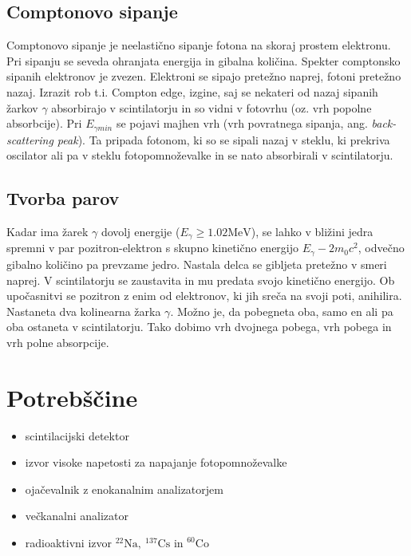 \documentclass[11pt]{article}
\begin{document}
\subsection{Comptonovo sipanje}\label{sec:org322b661}

Comptonovo sipanje je neelastično sipanje fotona na skoraj prostem elektronu.
Pri sipanju se seveda ohranjata energija in gibalna količina. Spekter
comptonsko sipanih elektronov je zvezen. Elektroni se sipajo pretežno naprej,
fotoni pretežno nazaj. Izrazit rob t.i. Compton edge, izgine, saj se
nekateri od nazaj sipanih žarkov \(\gamma\) absorbirajo v scintilatorju in
so vidni v fotovrhu (oz. vrh popolne absorbcije).
Pri \(E_{\gamma min}\) se pojavi majhen vrh (vrh povratnega sipanja, ang.
\emph{back-scattering peak}). Ta pripada fotonom, ki so se sipali nazaj v steklu,
ki prekriva oscilator ali pa v steklu fotopomnoževalke in se nato absorbirali
v scintilatorju.
\subsection{Tvorba parov}\label{sec:org4af1b3a}

Kadar ima žarek \(\gamma\) dovolj energije (\(E_{\gamma} \ge 1.02 \mathrm{MeV}\)),
se lahko v bližini jedra spremni v par pozitron-elektron s skupno kinetično
energijo \(E_{\gamma} - 2 m_0 c ^2\), odvečno gibalno količino pa prevzame
jedro. Nastala delca se gibljeta pretežno v smeri naprej. V scintilatorju se
zaustavita in mu predata svojo kinetično energijo. Ob upočasnitvi se pozitron
z enim od elektronov, ki jih sreča na svoji poti, anihilira. Nastaneta dva
kolinearna žarka \(\gamma\). Možno je, da pobegneta oba, samo en ali pa oba
ostaneta v scintilatorju. Tako dobimo vrh dvojnega pobega, vrh pobega in vrh
polne absorpcije.
\section{Potrebščine}\label{sec:orgaba5d65}
\begin{itemize}
\item scintilacijski detektor
\item izvor visoke napetosti za napajanje fotopomnoževalke
\item ojačevalnik z enokanalnim analizatorjem
\item večkanalni analizator
\item radioaktivni izvor \(^{22} \mathrm{Na}, \ ^{137} \mathrm{Cs} \text{ in } ^{60} \mathrm{Co}\)
\end{itemize}
\end{document}

